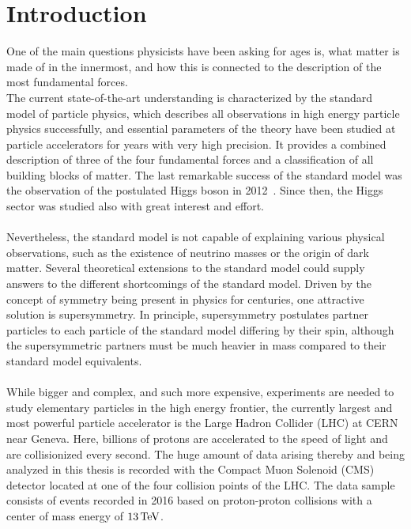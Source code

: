 \chapter{Introduction}\label{chap:intro}

One of the main questions physicists have been asking for ages is, what matter is made of in the innermost, and how this is connected to the description of the most fundamental forces.\\
The current state-of-the-art understanding is characterized by the standard model of particle physics, which describes all observations in high energy particle physics successfully, and essential parameters of the theory have been studied at particle accelerators for years with very high precision. It provides a combined description of three of the four fundamental forces and a classification of all building blocks of matter. The last remarkable success of the standard model was the observation of the postulated Higgs boson in 2012~\cite{HiggsCMS,HiggsATLAS,HiggsCombined}. Since then, the Higgs sector was studied also with great interest and effort.\\\\
Nevertheless, the standard model is not capable of explaining various physical observations, such as the existence of neutrino masses or the origin of dark matter. Several theoretical extensions to the standard model could supply answers to the different shortcomings of the standard model. Driven by the concept of symmetry being present in physics for centuries, one attractive solution is supersymmetry. In principle, supersymmetry postulates partner particles to each particle of the standard model differing by their spin, although the supersymmetric partners must be much heavier in mass compared to their standard model equivalents.\\\\
While bigger and complex, and such more expensive, experiments are needed to study elementary particles in the high energy frontier, the currently largest and most powerful particle accelerator is the Large Hadron Collider (LHC) at CERN near Geneva. Here, billions of protons are accelerated to the speed of light and are collisionized every second. The huge amount of data arising thereby and being analyzed in this thesis is recorded with the Compact Muon Solenoid (CMS) detector located at one of the four collision points of the LHC. The data sample consists of events recorded in 2016 based on proton-proton collisions with a center of mass energy of $13\,\text{Te\hspace{-.08em}V}$.\\\\
